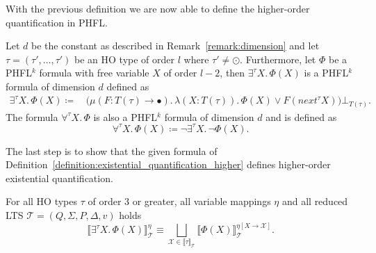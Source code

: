 With the previous definition we are now able to define the higher-order quantification in PHFL.

\begin{definition}
    \label{definition:existential_quantification_higher}
    Let $d$ be the constant as described in Remark~\ref{remark:dimension} and let $\tau = (\tau', \dots, \tau')$ be an HO type of order $l$ where $\tau' \neq \odot$. Furthermore, let
    $\Phi$ be a PHFL$^k$ formula with free variable $X$ of order $l - 2$, then $\exists^{\tau}X .\,\Phi(X)$
    is a PHFL$^k$ formula of dimension $d$ defined as
    \begin{align*}
        \exists^{\tau}X.\, \Phi(X) \coloneqq &\,\big(\mu (F \colon T(\tau) \rightarrow \bullet).\, \lambda (X \colon T(\tau)
        ).\,
        \Phi(X)
        \vee F(next^\tau X)\big)\bot_{T(\tau)}.
    \end{align*}
    The formula $\forall^{\tau}X.\,\Phi$ is also a PHFL$^k$ formula of dimension $d$ and is defined as
    \[\forall^{\tau}X.\,\Phi(X) \coloneqq \neg \exists^{\tau}X .\,\neg\Phi(X).\]
\end{definition}

The last step is to show that the given formula of Definition~\ref{definition:existential_quantification_higher} defines
higher-order existential quantification.

\begin{lemma}
    \label{lemma:existential_quantifier_higher}
    For all HO types $\tau$ of order $3$ or greater, all variable mappings $\eta$ and all reduced LTS $\mathcal{T} = (Q, \Sigma, P, \Delta, v)$ holds
    \[\llbracket \exists^\tau X.\,\Phi(X)\rrbracket^\eta_\mathcal{T} \equiv \underset{\mathcal{X} \in \llbracket \tau
    \rrbracket_\mathcal{T}}{\bigsqcup} \llbracket \Phi(X) \rrbracket^{\eta[X\rightarrow \mathcal{X}]}_\mathcal{T}.\]
\end{lemma}

